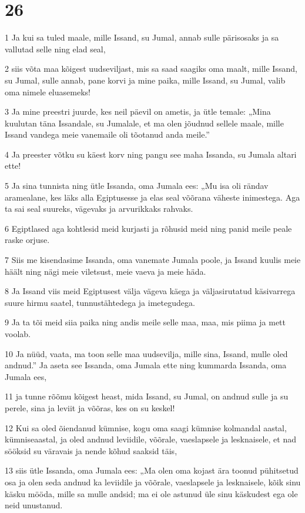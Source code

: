 \chapter{26}

\par 1 Ja kui sa tuled maale, mille Issand, su Jumal, annab sulle pärisosaks ja sa vallutad selle ning elad seal,
\par 2 siis võta maa kõigest uudseviljast, mis sa saad saagiks oma maalt, mille Issand, su Jumal, sulle annab, pane korvi ja mine paika, mille Issand, su Jumal, valib oma nimele eluasemeks!
\par 3 Ja mine preestri juurde, kes neil päevil on ametis, ja ütle temale: „Mina kuulutan täna Issandale, su Jumalale, et ma olen jõudnud sellele maale, mille Issand vandega meie vanemaile oli tõotanud anda meile.”
\par 4 Ja preester võtku su käest korv ning pangu see maha Issanda, su Jumala altari ette!
\par 5 Ja sina tunnista ning ütle Issanda, oma Jumala ees: „Mu isa oli rändav aramealane, kes läks alla Egiptusesse ja elas seal võõrana väheste inimestega. Aga ta sai seal suureks, vägevaks ja arvurikkaks rahvaks.
\par 6 Egiptlased aga kohtlesid meid kurjasti ja rõhusid meid ning panid meile peale raske orjuse.
\par 7 Siis me kisendasime Issanda, oma vanemate Jumala poole, ja Issand kuulis meie häält ning nägi meie viletsust, meie vaeva ja meie häda.
\par 8 Ja Issand viis meid Egiptusest välja vägeva käega ja väljasirutatud käsivarrega suure hirmu saatel, tunnustähtedega ja imetegudega.
\par 9 Ja ta tõi meid siia paika ning andis meile selle maa, maa, mis piima ja mett voolab.
\par 10 Ja nüüd, vaata, ma toon selle maa uudsevilja, mille sina, Issand, mulle oled andnud.” Ja aseta see Issanda, oma Jumala ette ning kummarda Issanda, oma Jumala ees,
\par 11 ja tunne rõõmu kõigest heast, mida Issand, su Jumal, on andnud sulle ja su perele, sina ja leviit ja võõras, kes on su keskel!
\par 12 Kui sa oled õiendanud kümnise, kogu oma saagi kümnise kolmandal aastal, kümniseaastal, ja oled andnud leviidile, võõrale, vaeslapsele ja lesknaisele, et nad sööksid su väravais ja nende kõhud saaksid täis,
\par 13 siis ütle Issanda, oma Jumala ees: „Ma olen oma kojast ära toonud pühitsetud osa ja olen seda andnud ka leviidile ja võõrale, vaeslapsele ja lesknaisele, kõik sinu käsku mööda, mille sa mulle andsid; ma ei ole astunud üle sinu käskudest ega ole neid unustanud.
